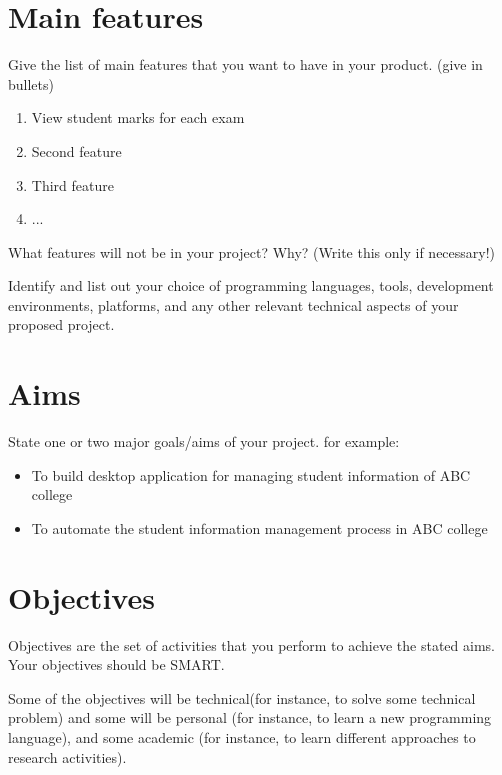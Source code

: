 \documentclass[12pt, a4paper]{report}
\begin{document}
\section{Main features} %
\label{sec:main_features}

Give the list of main features that you want to have in your product. (give in bullets)
\begin{enumerate}
  \item View student marks for each exam
  \item Second feature
  \item Third feature
  \item ...
\end{enumerate}
What features will not be in your project? Why? (Write this only if necessary!)

Identify and list out your choice of programming languages, tools, development environments, platforms, and any other relevant technical aspects of your proposed project.


\section{Aims} %
\label{sec:aims}

State one or two major goals/aims of your project.
for example:\\
\begin{itemize}
  \item To build desktop application for managing student information of ABC college
  \item To automate the student information management process in ABC college
\end{itemize}

\section{Objectives} %
\label{sec:objectives}
Objectives are the set of activities that you perform to achieve the stated aims. Your objectives should be SMART.

Some of the objectives will be technical(for instance, to solve some technical problem) and some will be personal (for instance, to learn a new programming language), and some academic (for instance, to learn different approaches to research activities).
\end{document}
